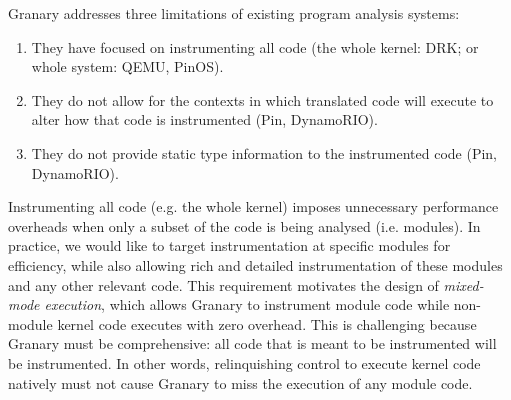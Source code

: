 \documentclass[preprint]{sigplanconf}
\begin{document}

Granary addresses three limitations of existing program analysis systems: \begin{enumerate}
	\item They have focused on instrumenting all code (the whole kernel: DRK; or whole system: QEMU, PinOS). 
	\item They do not allow for the contexts in which translated code will execute to alter how that code is instrumented (Pin, DynamoRIO).
	\item They do not provide static type information to the instrumented code (Pin, DynamoRIO).
\end{enumerate} 


Instrumenting all code (e.g. the whole kernel) imposes unnecessary performance overheads when only a subset of the code is being analysed (i.e. modules). In practice, we would like to target instrumentation at specific modules for efficiency, while also allowing rich and detailed instrumentation of these modules and any other relevant code. This requirement motivates the design of \emph{mixed-mode execution}, which allows Granary to instrument module code while non-module kernel code executes with zero overhead. This is challenging because Granary must be comprehensive: all code that is meant to be instrumented will be instrumented. In other words, relinquishing control to execute kernel code natively must not cause Granary to miss the execution of any module code. %
\end{document}
